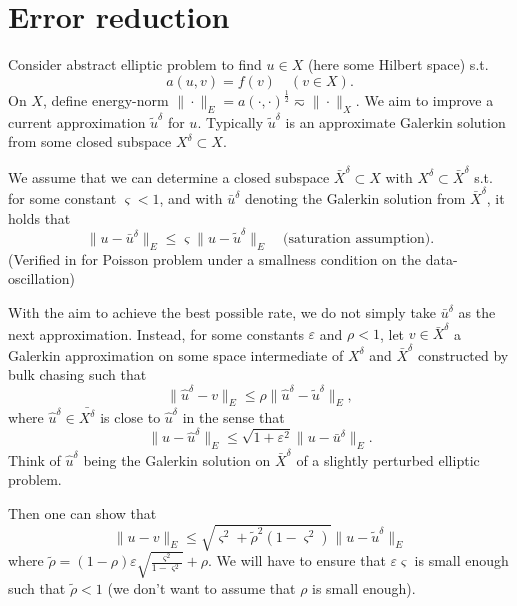 \documentclass{amsart}
\theoremstyle{definition}
\theoremstyle{remark}
\numberwithin{equation}{section}
\newcommand{\eps}{\varepsilon}
\newcommand{\be}{\begin{equation}}
\newcommand{\ee}{\end{equation}}
\newcommand{\1}{\mathbb 1}
\begin{document}
\section{Error reduction} \label{Sreduction}
Consider abstract elliptic problem to find $u \in X$ (here some Hilbert space) s.t.
\be \label{n1}
a(u,v)=f(v)\quad (v \in X).
\ee
On $X$, define energy-norm $\|\cdot\|_E=a(\cdot,\cdot)^{\frac12} \eqsim \|\cdot\|_X$.
We aim to improve a current approximation $\tilde{u}^\delta$ for $u$.
Typically $\tilde{u}^\delta$ is an approximate Galerkin solution from some closed subspace $X^\delta \subset X$.

We assume that we can determine a closed subspace $\bar{X}^\delta \subset X$ with $X^\delta \subset \bar{X}^\delta$ s.t. for some constant $\varsigma<1$, and with $\bar{u}^\delta$ denoting the Galerkin solution from $\bar{X}^\delta$, it holds that
\be \label{n2}
\|u-\bar{u}^\delta\|_E \leq \varsigma \|u-\tilde{u}^\delta\|_E \quad \text{(saturation assumption)}.
\ee
(Verified in \cite{35.937} for Poisson problem under a smallness condition on the data-oscillation)

With the aim to achieve the best possible rate, we do not simply take $\bar{u}^\delta$ as the next approximation.
Instead, for some constants $\eps$ and $\rho<1$, let $v \in \bar{X}^\delta$ 
a Galerkin approximation on some space intermediate of $X^\delta$ and $\bar{X}^\delta$ constructed by bulk chasing such that
\be \label{n3}
\|\hat{u}^\delta-v\|_E \leq \rho \|\hat{u}^\delta-\tilde{u}^\delta\|_E,
\ee
where $\hat{u}^\delta \in \bar{X^\delta}$ is close to $\hat{u}^\delta$ in the sense that
\be \label{n4}
\|u-\hat{u}^\delta\|_E \leq \sqrt{1+\eps^2} \|u-\bar{u}^\delta\|_E.
\ee
Think of $\hat{u}^\delta$ being the Galerkin solution on $\bar{X}^\delta$ of a slightly perturbed elliptic problem.


Then one can show that
$$
\|u-v\|_E \leq \sqrt{\varsigma^2+\tilde{\rho}^2(1-\varsigma^2)}\|u-\tilde{u}^\delta\|_E
$$
where $\tilde{\rho}=(1-\rho) \eps \sqrt{\frac{\varsigma^2}{1-\varsigma^2}}+\rho$.
We will have to ensure that $\eps \varsigma$ is small enough such that $\tilde{\rho}<1$ (we don't want to assume that $\rho$ is small enough).
\end{document}
